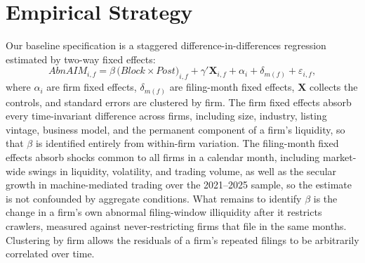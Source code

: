 \documentclass[12pt]{article}
\begin{document}
\section{Empirical Strategy}\label{sec:strategy}
Our baseline specification is a staggered difference-in-differences regression estimated by two-way fixed effects:
\begin{equation}
\mathit{AbnAIM}_{i,f}
= \beta\,\bigl(\mathit{Block}\times\mathit{Post}\bigr)_{i,f}
+ \gamma'\mathbf{X}_{i,f}
+ \alpha_i + \delta_{m(f)} + \varepsilon_{i,f},
\label{eq:twfe}
\end{equation}
where $\alpha_i$ are firm fixed effects, $\delta_{m(f)}$ are filing-month fixed effects, $\mathbf{X}$ collects the controls, and standard errors are clustered by firm. The firm fixed effects absorb every time-invariant difference across firms, including size, industry, listing vintage, business model, and the permanent component of a firm's liquidity, so that $\beta$ is identified entirely from within-firm variation. The filing-month fixed effects absorb shocks common to all firms in a calendar month, including market-wide swings in liquidity, volatility, and trading volume, as well as the secular growth in machine-mediated trading over the 2021--2025 sample, so the estimate is not confounded by aggregate conditions. What remains to identify $\beta$ is the change in a firm's own abnormal filing-window illiquidity after it restricts crawlers, measured against never-restricting firms that file in the same months. Clustering by firm allows the residuals of a firm's repeated filings to be arbitrarily correlated over time.
\end{document}

